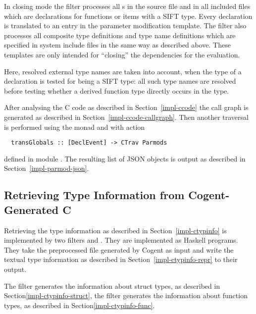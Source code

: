 In closing mode the filter processes all s in the source file and in all included files which
are declarations for functions or items with a SIFT type. Every declaration is translated to an entry in the parameter
modification template. The filter also processes all composite type definitions and type name definitions which
are specified in system include files in the same way as described above. 
These templates are only intended for ``closing'' the dependencies for the evaluation.

Here, resolved external type names are taken into account, when the type of a declaration is tested for 
being a SIFT type: all such type names are resolved before testing whether a derived function type directly
occurs in the type.

After analysing the C code as described in Section~\ref{impl-ccode} the call graph is generated as described
in Section~\ref{impl-ccode-callgraph}. Then another traversal is performed using the  monad and
 with action
\begin{verbatim}
  transGlobals :: [DeclEvent] -> CTrav Parmods
\end{verbatim}
defined in module . The resulting list of JSON objects is output as described 
in Section~\ref{impl-parmod-json}.

\subsection{Retrieving Type Information from Cogent-Generated C}
\label{impl-ccomps-ctypinfo}

Retrieving the type information as described in Section~\ref{impl-ctypinfo} is implemented by two filters
 and . They are implemented as Haskell programs. They take
the preprocessed  file generated by Cogent as input and write the textual type information 
as described in Section~\ref{impl-ctypinfo-repr} to their output.

The filter  generates the information about struct types, as described in 
Section\ref{impl-ctypinfo-struct}, the filter  generates the information about 
function types, as described in Section\ref{impl-ctypinfo-func}.


